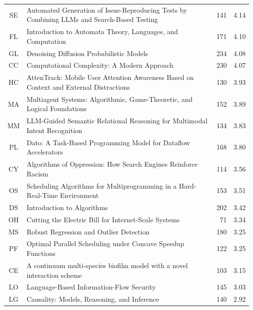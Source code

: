 \begin{table}[t]
\begin{tabular}{clrc}
SE & Automated Generation of Issue-Reproducing Tests by Combining LLMs and Search-Based Testing & \cellcolor{green!16}141 & \cellcolor{green!16}4.14 \\
FL & Introduction to Automata Theory, Languages, and Computation & \cellcolor{green!16}171 & \cellcolor{green!16}4.10 \\
GL & Denoising Diffusion Probabilistic Models & \cellcolor{green!16}234 & \cellcolor{green!16}4.08 \\
CC & Computational Complexity: A Modern Approach & \cellcolor{green!16}230 & \cellcolor{green!16}4.07 \\
HC & AttenTrack: Mobile User Attention Awareness Based on Context and External Distractions & \cellcolor{green!12}130 & \cellcolor{green!12}3.93 \\
MA & Multiagent Systems: Algorithmic, Game-Theoretic, and Logical Foundations & \cellcolor{green!12}152 & \cellcolor{green!12}3.89 \\
MM & LLM-Guided Semantic Relational Reasoning for Multimodal Intent Recognition & \cellcolor{green!12}134 & \cellcolor{green!12}3.83 \\
PL & Dato: A Task-Based Programming Model for Dataflow Accelerators & \cellcolor{green!12}168 & \cellcolor{green!12}3.80 \\
CY & Algorithms of Oppression: How Search Engines Reinforce Racism & \cellcolor{green!12}114 & \cellcolor{green!12}3.56 \\
OS & Scheduling Algorithms for Multiprogramming in a Hard-Real-Time Environment & \cellcolor{green!12}153 & \cellcolor{green!12}3.51 \\
DS & Introduction to Algorithms & \cellcolor{green!12}202 & \cellcolor{green!12}3.42 \\
OH & Cutting the Electric Bill for Internet-Scale Systems & \cellcolor{green!12}71 & \cellcolor{green!12}3.34 \\
MS & Robust Regression and Outlier Detection & \cellcolor{green!12}180 & \cellcolor{green!12}3.25 \\
PF & Optimal Parallel Scheduling under Concave Speedup Functions & \cellcolor{green!12}122 & \cellcolor{green!12}3.25 \\
CE & A continuum multi-species biofilm model with a novel interaction scheme & \cellcolor{green!12}103 & \cellcolor{green!12}3.15 \\
LO & Language-Based Information-Flow Security & \cellcolor{green!12}145 & \cellcolor{green!12}3.03 \\
LG & Causality: Models, Reasoning, and Inference & \cellcolor{green!8}140 & \cellcolor{green!8}2.92 \\

\end{tabular}
\end{table}
